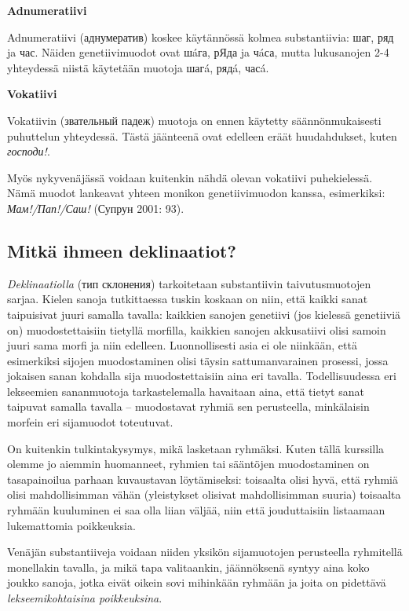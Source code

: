 \documentclass[]{scrartcl}
\begin{document}
\textbf{Adnumeratiivi}

Adnumeratiivi (аднумератив) koskee käytännössä kolmea substantiivia:
шаг, ряд ja час. Näiden genetiivimuodot ovat шáга, рЯда ja чáса, mutta
lukusanojen 2-4 yhteydessä niistä käytetään muotoja шагá, рядá, часá.

\textbf{Vokatiivi}

Vokatiivin (звательный падеж) muotoja on ennen käytetty
säännönmukaisesti puhuttelun yhteydessä. Tästä jäänteenä ovat edelleen
eräät huudahdukset, kuten \emph{господи!}.

Myös nykyvenäjässä voidaan kuitenkin nähdä olevan vokatiivi
puhekielessä. Nämä muodot lankeavat yhteen monikon genetiivimuodon
kanssa, esimerkiksi: \emph{Мам!/Пап!/Саш!} (Супрун 2001: 93).

\subsection{Mitkä ihmeen
deklinaatiot?}\label{mitkuxe4-ihmeen-deklinaatiot}

\emph{Deklinaatiolla} (тип склонения) tarkoitetaan substantiivin
taivutusmuotojen sarjaa. Kielen sanoja tutkittaessa tuskin koskaan on
niin, että kaikki sanat taipuisivat juuri samalla tavalla: kaikkien
sanojen genetiivi (jos kielessä genetiiviä on) muodostettaisiin tietyllä
morfilla, kaikkien sanojen akkusatiivi olisi samoin juuri sama morfi ja
niin edelleen. Luonnollisesti asia ei ole niinkään, että esimerkiksi
sijojen muodostaminen olisi täysin sattumanvarainen prosessi, jossa
jokaisen sanan kohdalla sija muodostettaisiin aina eri tavalla.
Todellisuudessa eri lekseemien sananmuotoja tarkastelemalla havaitaan
aina, että tietyt sanat taipuvat samalla tavalla -- muodostavat ryhmiä
sen perusteella, minkälaisin morfein eri sijamuodot toteutuvat.

On kuitenkin tulkintakysymys, mikä lasketaan ryhmäksi. Kuten tällä
kurssilla olemme jo aiemmin huomanneet, ryhmien tai sääntöjen
muodostaminen on tasapainoilua parhaan kuvaustavan löytämiseksi:
toisaalta olisi hyvä, että ryhmiä olisi mahdollisimman vähän
(yleistykset olisivat mahdollisimman suuria) toisaalta ryhmään
kuuluminen ei saa olla liian väljää, niin että jouduttaisiin listaamaan
lukemattomia poikkeuksia.

Venäjän substantiiveja voidaan niiden yksikön sijamuotojen perusteella
ryhmitellä monellakin tavalla, ja mikä tapa valitaankin, jäännöksenä
syntyy aina koko joukko sanoja, jotka eivät oikein sovi mihinkään
ryhmään ja joita on pidettävä \emph{lekseemikohtaisina poikkeuksina}.
\end{document}

